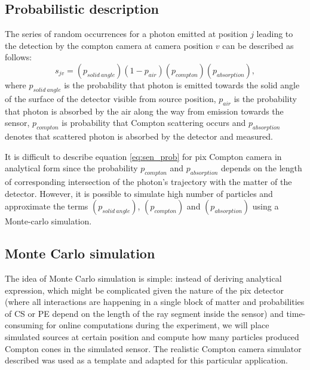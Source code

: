 \subsection{Probabilistic description}%
The series of random occurrences for a photon emitted at position $j$ leading to the detection by the compton camera at camera position $v$ can be described as follows:
\begin{equation}
  s_{jv} =  (p_{solid\ angle})(1-p_{air})(p_{compton})(p_{absorption}),
  \label{eq:sen_prob}
\end{equation}
where $p_{solid\ angle}$ is the probability that photon is emitted towards the solid angle of the surface of the detector visible from source position, 
$p_{air}$ is the probability that photon is absorbed by the air along the way from emission towards the sensor, 
$p_{compton}$ is probability that Compton scattering occurs and $p_{absorption}$ denotes that scattered photon is absorbed by the detector and measured.

It is difficult to describe  equation \ref{eq:sen_prob} for \ac{pix} Compton camera in analytical form since the probability $p_{compton}$ and $p_{absorption}$ depends on the length of corresponding intersection of the photon's trajectory with the matter of the detector.  
However, it is possible to simulate high number of particles and approximate the terms $(p_{solid\ angle})$, $(p_{compton})$ and $(p_{absorption})$ using a Monte-carlo simulation.%

\subsection{Monte Carlo simulation}%
The idea of Monte Carlo simulation is simple:
instead of deriving analytical expression,
which might be complicated given the nature of the \ac{pix} detector (where all interactions are happening in a single block of matter and probabilities of \ac{CS} or \ac{PE} depend on the length of the ray segment inside the sensor) and time-consuming for online computations during the experiment,
we will place simulated sources at certain position and compute how many particles produced Compton cones in the simulated sensor.
The realistic Compton camera simulator described \cite{baca2019timepix} was used as a template and adapted for this particular application.

